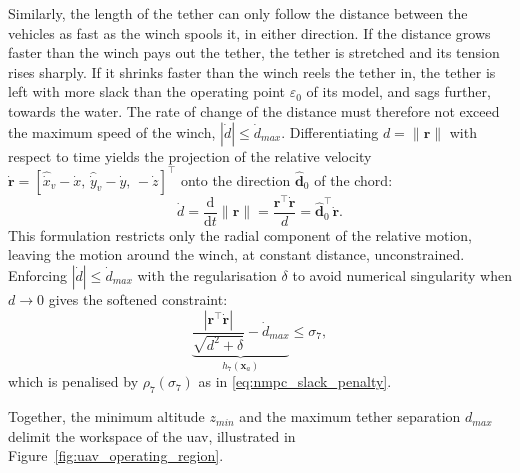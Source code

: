 Similarly, the length of the tether can only follow the distance between the vehicles as fast as the winch spools it, in either direction. If the distance grows faster than the winch pays out the tether, the tether is stretched and its tension rises sharply. If it shrinks faster than the winch reels the tether in, the tether is left with more slack than the operating point $\varepsilon_0$ of its model, and sags further, towards the water. The rate of change of the distance must therefore not exceed the maximum speed of the winch, $|\dot d| \le \dot d_{max}$. Differentiating $d = \|\mathbf{r}\|$ with respect to time yields the projection of the relative velocity $\dot{\mathbf{r}} = [\hat{\dot x}_v-\dot x,\, \hat{\dot y}_v-\dot y,\, -\dot z]^\top$ onto the direction $\hat{\mathbf{d}}_0$ of the chord:
\begin{equation}
    \dot d = \frac{\mathrm{d}}{\mathrm{d}t}\|\mathbf{r}\| = \frac{\mathbf{r}^\top\dot{\mathbf{r}}}{d} = \hat{\mathbf{d}}_0^\top\dot{\mathbf{r}}.
    \label{eq:uav_mpc_tether_rate_deriv}
\end{equation}
This formulation restricts only the radial component of the relative motion, leaving the motion around the winch, at constant distance, unconstrained. Enforcing $|\dot d| \le \dot d_{max}$ with the regularisation $\delta$ to avoid numerical singularity when $d \to 0$ gives the softened constraint:
\begin{equation}
    \underbrace{\frac{|\mathbf{r}^\top \dot{\mathbf{r}}|}{\sqrt{d^2 + \delta}} - \dot d_{max}}_{h_7(\mathbf{x}_a)} \le \sigma_7,
    \label{eq:uav_mpc_tether_rate_constraint}
\end{equation}
which is penalised by $\rho_7(\sigma_7)$ as in \eqref{eq:nmpc_slack_penalty}.

Together, the minimum altitude $z_{min}$ and the maximum tether separation $d_{max}$ delimit the workspace of the \gls{uav}, illustrated in Figure~\ref{fig:uav_operating_region}.


